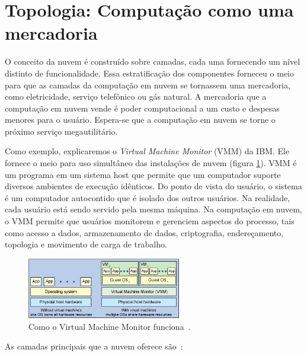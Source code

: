 \section{Topologia: Computação como uma mercadoria}

O conceito da nuvem é construído sobre camadas, cada uma fornecendo um nível
distinto de funcionalidade. Essa estratificação dos componentes forneceu o
meio para que as camadas da computação em nuvem se tornassem uma mercadoria, como
eletricidade, serviço telefônico ou gás natural. A mercadoria que a computação em
nuvem vende é poder computacional a um custo e despesas menores para o usuário.
Espera-se que a computação em nuvem se torne o próximo serviço megautilitário.

Como exemplo, explicaremos o \emph{Virtual Machine Monitor} (VMM) da IBM. Ele fornece o meio para
uso simultâneo das instalações de nuvem (figura \ref{fig:vmm}). VMM é um programa em
um sistema host que permite que um computador suporte diversos ambientes de execução
idênticos. Do ponto de vista do usuário, o sistema é um computador autocontido que
é isolado dos outros usuários. Na realidade, cada usuário está sendo servido pela
mesma máquina. Na computação em nuvem, o VMM permite que usuários monitorem e gerenciem
aspectos do processo, tais como acesso a dados, armazenamento de dados, criptografia,
endereçamento, topologia e movimento de carga de trabalho. 


\begin{figure}[ht]
    \centering
    \includegraphics[width=0.6\textwidth]{img/vmm.png}
    \caption{Como o Virtual Machine Monitor funciona~\cite{cloud-computing-fundamentals}.}
    \label{fig:vmm}
\end{figure}


As camadas principais que a nuvem oferece são~\cite{cloud-computing-fundamentals}:

\newcommand{\itemm}[1]{\item\textbf{#1}}

